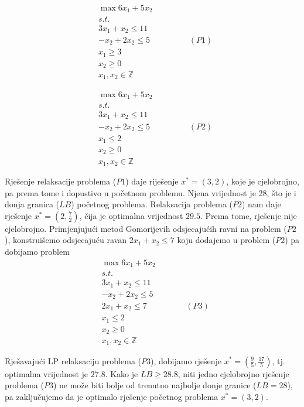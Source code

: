 \documentclass[a4paper, utf8, 11pt, colorlinks]{book}
\begin{document}
\begin{align*}
    &\max 6 x_1 + 5 x_2 \\
    & {s.t. } \\
    & 3x_1 + x_2 \leq 11 \\
    & - x_2 + 2 x_2 \leq 5 \hspace{2cm} (P1) \\
    & x_1 \geq 3 \\
    & x_2 \geq 0 \\
    & x_1, x_2 \in \mathbb{Z}
\end{align*}

\begin{align*}
    &\max 6 x_1 + 5 x_2 \\
    & {s.t. } \\
    & 3x_1 + x_2 \leq 11 \\
    & - x_2 + 2 x_2 \leq 5 \hspace{2cm} (P2) \\
    & x_1  \leq 2 \\
    & x_2 \geq 0 \\
    & x_1, x_2 \in \mathbb{Z}
\end{align*}

Rješenje relaksacije problema ($P1$) daje riješenje $x^*=(3,2)$, koje je cjelobrojno, pa prema tome i dopustivo u početnom problemu. Njena vrijednost je 28, što je i donja granica ($LB$) početnog problema. Relaksacija problema ($P2$) nam daje rješenje $x^*=(2, \frac{7}{2})$, čija je optimalna vrijednost $29.5$.  Prema tome, rješenje nije cjelobrojno. Primjenjujući metod Gomorijevih odsjecajućih ravni na problem ($P2$), konstruišemo odsjecajuću ravan $2x_1 + x_2 \leq 7$ koju dodajemo u problem ($P2$) pa dobijamo problem 
\begin{align*}
    &\max 6 x_1 + 5 x_2 \\
    & {s.t. } \\
    & 3x_1 + x_2 \leq 11 \\
    & - x_2 + 2 x_2 \leq 5  \\
    & 2x_1 + x_2 \leq 7 \hspace{2cm} (P3)\\ 
    & x_1  \leq 2 \\
    & x_2 \geq 0 \\
    & x_1, x_2 \in \mathbb{Z}
\end{align*}

Rješavajući LP relaksaciju problema ($P3$), dobijamo rješenje $x^*=(\frac{9}{5}, \frac{17}{5})$, tj.  optimalna vrijednost je $27.8$. Kako je $LB \geq 28.8$, niti jedno cjelobrojno rješenje problema ($P3$) ne može biti bolje od trenutno najbolje donje granice ($LB=28$), pa zaključujemo da je optimalo rješenje početnog problema $x^*=(3,2)$. 
\end{document}
